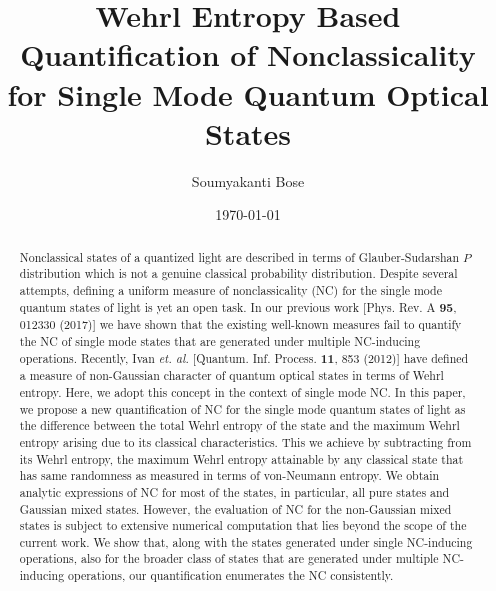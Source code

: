 \documentclass[letter,scriptaddress,twocolumn,prl,showkeys]{revtex4}
\begin{document}
\title {Wehrl Entropy Based Quantification of Nonclassicality \\
for Single Mode Quantum Optical States}

\author{Soumyakanti Bose}

\date{\today}

\begin{abstract}

Nonclassical states of a quantized light are described in terms of Glauber-Sudarshan $P$ distribution which is not a genuine classical probability distribution. 
Despite several attempts, defining a uniform measure of nonclassicality (NC) for the single mode quantum states of light is yet an open task. 
In our previous work [{Phys. Rev. A {\bf 95}, 012330 (2017)}] we have shown that the existing well-known measures fail to quantify the NC of single mode states that are generated under multiple NC-inducing operations. 
Recently, Ivan {\em et. al.} [{Quantum. Inf. Process. {\bf 11}, 853 (2012)}] have defined a measure of non-Gaussian character of quantum optical states in terms of Wehrl entropy.
Here, we adopt this concept in the context of single mode NC. 
In this paper, we propose a new quantification of NC for the single mode quantum states of light
as the difference between the total Wehrl entropy of the state and the maximum Wehrl entropy arising due to its classical characteristics.
This we achieve by subtracting from its Wehrl entropy, the maximum Wehrl entropy attainable by any classical state that has same randomness as measured in terms of von-Neumann entropy.
We obtain analytic expressions of NC for most of the states, in particular, all pure states and Gaussian mixed states. 
However, the evaluation of NC for the non-Gaussian mixed states is subject to extensive numerical computation that lies beyond the scope of the current work. 
We show that, along with the states generated under single NC-inducing operations, also for the broader class of states that are generated under multiple NC-inducing operations, our quantification enumerates the NC consistently.

\end{abstract}
\end{document}

